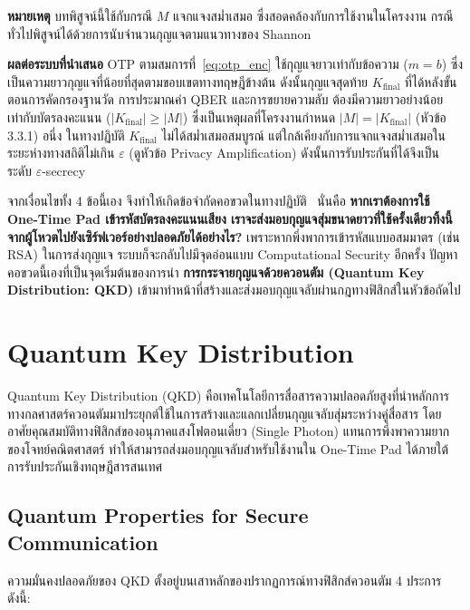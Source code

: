 \medskip
\noindent \textbf{หมายเหตุ} บทพิสูจน์นี้ใช้กับกรณี $M$ แจกแจงสม่ำเสมอ ซึ่งสอดคล้องกับการใช้งานในโครงงาน กรณีทั่วไปพิสูจน์ได้ด้วยการนับจำนวนกุญแจตามแนวทางของ Shannon~\cite{shannon_secure}

\noindent \textbf{ผลต่อระบบที่นำเสนอ} OTP ตามสมการที่~\eqref{eq:otp_enc} ใช้กุญแจยาวเท่ากับข้อความ ($m = b$) ซึ่งเป็นความยาวกุญแจที่น้อยที่สุดตามขอบเขตทางทฤษฎีข้างต้น ดังนั้นกุญแจสุดท้าย $K_{\text{final}}$ ที่ได้หลังขั้นตอนการคัดกรองฐานวัด การประมาณค่า QBER และการขยายความลับ ต้องมีความยาวอย่างน้อยเท่ากับบัตรลงคะแนน ($|K_{\text{final}}| \ge |M|$) ซึ่งเป็นเหตุผลที่โครงงานกำหนด $|M| = |K_{\text{final}}|$ (หัวข้อ 3.3.1) อนึ่ง ในทางปฏิบัติ $K_{\text{final}}$ ไม่ได้สม่ำเสมอสมบูรณ์ แต่ใกล้เคียงกับการแจกแจงสม่ำเสมอในระยะห่างทางสถิติไม่เกิน $\varepsilon$ (ดูหัวข้อ Privacy Amplification) ดังนั้นการรับประกันที่ได้จึงเป็นระดับ $\varepsilon$-secrecy

\medskip
\noindent จากเงื่อนไขทั้ง 4 ข้อนี้เอง จึงทำให้เกิดข้อจำกัดคอขวดในทางปฏิบัติ~\cite{cerruti2021timepadshortkey} นั่นคือ \textbf{หากเราต้องการใช้ One-Time Pad เข้ารหัสบัตรลงคะแนนเสียง เราจะส่งมอบกุญแจสุ่มขนาดยาวที่ใช้ครั้งเดียวทิ้งนี้จากผู้โหวตไปยังเซิร์ฟเวอร์อย่างปลอดภัยได้อย่างไร?} เพราะหากพึ่งพาการเข้ารหัสแบบอสมมาตร (เช่น RSA) ในการส่งกุญแจ ระบบก็จะกลับไปมีจุดอ่อนแบบ Computational Security อีกครั้ง ปัญหาคอขวดนี้เองที่เป็นจุดเริ่มต้นของการนำ \textbf{การกระจายกุญแจด้วยควอนตัม (Quantum Key Distribution: QKD)} เข้ามาทำหน้าที่สร้างและส่งมอบกุญแจลับผ่านกฎทางฟิสิกส์ในหัวข้อถัดไป

\section{Quantum Key Distribution}
Quantum Key Distribution (QKD) คือเทคโนโลยีการสื่อสารความปลอดภัยสูงที่นำหลักการทางกลศาสตร์ควอนตัมมาประยุกต์ใช้ในการสร้างและแลกเปลี่ยนกุญแจลับสุ่มระหว่างคู่สื่อสาร โดยอาศัยคุณสมบัติทางฟิสิกส์ของอนุภาคแสงโฟตอนเดี่ยว (Single Photon) แทนการพึ่งพาความยากของโจทย์คณิตศาสตร์ ทำให้สามารถส่งมอบกุญแจลับสำหรับใช้งานใน One-Time Pad ได้ภายใต้การรับประกันเชิงทฤษฎีสารสนเทศ

\subsection{Quantum Properties for Secure Communication}
ความมั่นคงปลอดภัยของ QKD ตั้งอยู่บนเสาหลักของปรากฏการณ์ทางฟิสิกส์ควอนตัม 4 ประการ ดังนี้:

